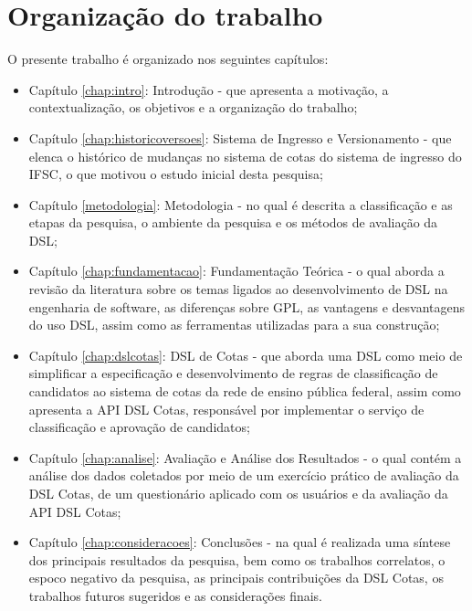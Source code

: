 \section{Organização do trabalho}
\label{organizacao}

O presente trabalho é organizado nos seguintes capítulos:

\begin{itemize}
    \item Capítulo \ref{chap:intro}: Introdução - que apresenta a motivação, a contextualização, os objetivos e a organização do trabalho;
    \item Capítulo \ref{chap:historicoversoes}: Sistema de Ingresso e Versionamento - que elenca o histórico de mudanças no sistema de cotas do sistema de ingresso do \gls{IFSC}, o que motivou o estudo inicial desta pesquisa;
    \item Capítulo \ref{metodologia}: Metodologia - no qual é descrita a classificação e as etapas da pesquisa, o ambiente da pesquisa e os métodos de avaliação da DSL;
    \item Capítulo \ref{chap:fundamentacao}: Fundamentação Teórica - o qual aborda a revisão da literatura sobre os temas ligados ao desenvolvimento de \gls{DSL} na engenharia de software, as diferenças sobre \gls{GPL}, as vantagens e desvantagens do uso  \gls{DSL}, assim como as ferramentas utilizadas para a sua construção;
    \item Capítulo \ref{chap:dslcotas}: DSL de Cotas - que aborda uma \gls{DSL} como meio de simplificar a especificação e desenvolvimento de regras de classificação de candidatos ao sistema de cotas da rede de ensino pública federal, assim como apresenta a \gls{API} DSL Cotas, responsável por implementar o serviço de classificação e aprovação de candidatos;
    \item Capítulo \ref{chap:analise}: Avaliação e Análise dos Resultados - o qual contém a análise dos dados coletados por meio de um exercício prático de avaliação da DSL Cotas, de um questionário aplicado com os usuários e da avaliação da
    \gls{API} DSL Cotas;
    \item Capítulo \ref{chap:consideracoes}: Conclusões - na qual é realizada uma síntese dos principais resultados da pesquisa, bem como os trabalhos correlatos, o espoco negativo da pesquisa, as principais contribuições da DSL Cotas, os trabalhos futuros sugeridos e as considerações finais.
\end{itemize}
